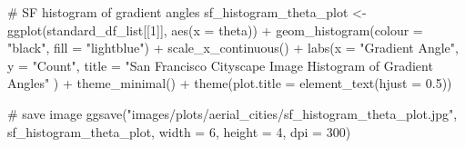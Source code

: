 \documentclass[
  letterpaper,
  DIV=11,
  numbers=noendperiod]{scrreprt}
\newenvironment{Shaded}{\begin{snugshade}}{\end{snugshade}}
\newcommand{\AttributeTok}[1]{\textcolor[rgb]{0.40,0.45,0.13}{#1}}
\newcommand{\CommentTok}[1]{\textcolor[rgb]{0.37,0.37,0.37}{#1}}
\newcommand{\DecValTok}[1]{\textcolor[rgb]{0.68,0.00,0.00}{#1}}
\newcommand{\FloatTok}[1]{\textcolor[rgb]{0.68,0.00,0.00}{#1}}
\newcommand{\FunctionTok}[1]{\textcolor[rgb]{0.28,0.35,0.67}{#1}}
\newcommand{\NormalTok}[1]{\textcolor[rgb]{0.00,0.23,0.31}{#1}}
\newcommand{\OtherTok}[1]{\textcolor[rgb]{0.00,0.23,0.31}{#1}}
\newcommand{\SpecialCharTok}[1]{\textcolor[rgb]{0.37,0.37,0.37}{#1}}
\newcommand{\StringTok}[1]{\textcolor[rgb]{0.13,0.47,0.30}{#1}}
\begin{document}
\begin{Shaded}
\begin{Highlighting}[]
\CommentTok{\# SF histogram of gradient angles}
\NormalTok{sf\_histogram\_theta\_plot }\OtherTok{\textless{}{-}}
  \FunctionTok{ggplot}\NormalTok{(standard\_df\_list[[}\DecValTok{1}\NormalTok{]], }
         \FunctionTok{aes}\NormalTok{(}\AttributeTok{x =}\NormalTok{ theta)) }\SpecialCharTok{+}
  \FunctionTok{geom\_histogram}\NormalTok{(}\AttributeTok{colour =} \StringTok{"black"}\NormalTok{, }\AttributeTok{fill =} \StringTok{"lightblue"}\NormalTok{) }\SpecialCharTok{+}
  \FunctionTok{scale\_x\_continuous}\NormalTok{() }\SpecialCharTok{+} 
  \FunctionTok{labs}\NormalTok{(}\AttributeTok{x =} \StringTok{"Gradient Angle"}\NormalTok{, }
       \AttributeTok{y =} \StringTok{"Count"}\NormalTok{, }
       \AttributeTok{title =} \StringTok{"San Francisco Cityscape Image Histogram of Gradient Angles"}
\NormalTok{       ) }\SpecialCharTok{+}
  \FunctionTok{theme\_minimal}\NormalTok{() }\SpecialCharTok{+}
  \FunctionTok{theme}\NormalTok{(}\AttributeTok{plot.title =} \FunctionTok{element\_text}\NormalTok{(}\AttributeTok{hjust =} \FloatTok{0.5}\NormalTok{))}

\CommentTok{\# save image}
\FunctionTok{ggsave}\NormalTok{(}\StringTok{"images/plots/aerial\_cities/sf\_histogram\_theta\_plot.jpg"}\NormalTok{, sf\_histogram\_theta\_plot, }\AttributeTok{width =} \DecValTok{6}\NormalTok{, }\AttributeTok{height =} \DecValTok{4}\NormalTok{, }\AttributeTok{dpi =} \DecValTok{300}\NormalTok{)}
\end{Highlighting}
\end{Shaded}
\end{document}
